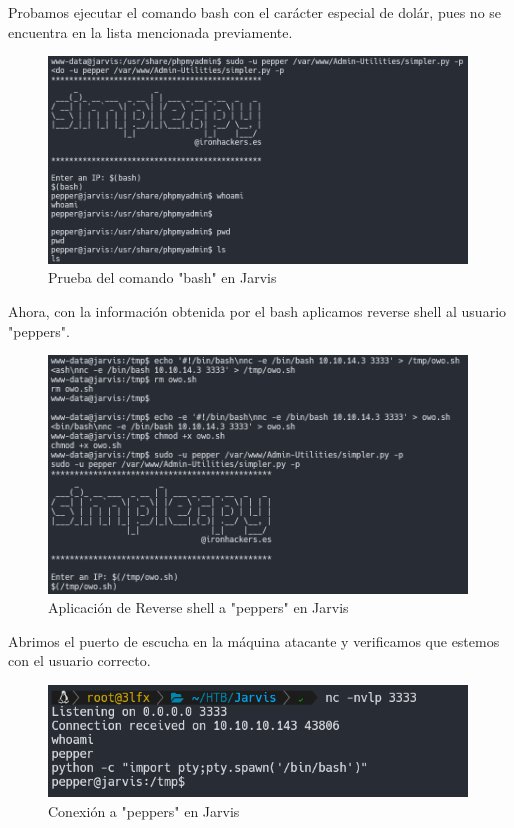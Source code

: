         \large{Probamos ejecutar el comando bash con el carácter especial de dolár, pues no se encuentra en la lista mencionada previamente.}
        \par
        \begin{figure}[H]
            \centering
            \includegraphics[width=0.99\textwidth]{imagenes/jarvis/16_prueba_bash_jarvis.png}
            \caption{Prueba del comando "bash" en Jarvis}
        \end{figure}

        \large{Ahora, con la información obtenida por el bash aplicamos reverse shell al usuario "peppers".}
        \par
        \begin{figure}[H]
            \centering
            \includegraphics[width=0.99\textwidth]{imagenes/jarvis/17_reverse_peppers_jarvis.png}
            \caption{Aplicación de Reverse shell a "peppers" en Jarvis}
        \end{figure}

        \large{Abrimos el puerto de escucha en la máquina atacante y verificamos que estemos con el usuario correcto.}
        \par
        \begin{figure}[H]
            \centering
            \includegraphics[width=0.99\textwidth]{imagenes/jarvis/18_conect_peppers_jarvis.png}
            \caption{Conexión a "peppers" en Jarvis}
        \end{figure}

